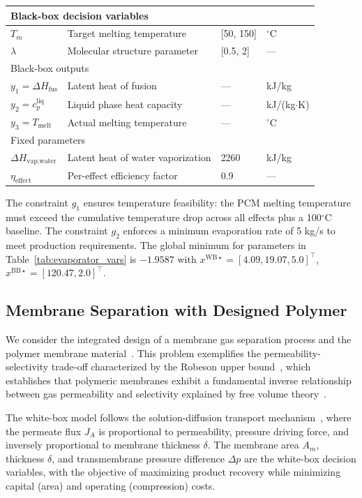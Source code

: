 \documentclass[12pt,a4paper]{article}%
\theoremstyle{plain}%
\theoremstyle{remark}%
\theoremstyle{definition}%
\def\WB{\mathrm{WB}}
\def\BB{\mathrm{BB}}
\begin{document}
\begin{appendices}
\begin{table}[htbp]
\begin{tabular}{@{}llll@{}}
\midrule
\multicolumn{4}{l}{Black-box decision variables} \\
\midrule
$T_m$ & Target melting temperature & [50, 150] & $^\circ$C \\
$\lambda$ & Molecular structure parameter & [0.5, 2] & --- \\
\midrule
\multicolumn{4}{l}{Black-box outputs} \\
\midrule
$y_1 = \Delta H_{\text{fus}}$ & Latent heat of fusion & --- & kJ/kg \\
$y_2 = c_p^{\text{liq}}$ & Liquid phase heat capacity & --- & kJ/(kg$\cdot$K) \\
$y_3 = T_{\text{melt}}$ & Actual melting temperature & --- & $^\circ$C \\
\midrule
\multicolumn{4}{l}{Fixed parameters} \\
\midrule
$\Delta H_{\text{vap,water}}$ & Latent heat of water vaporization & 2260 & kJ/kg \\
$\eta_{\text{effect}}$ & Per-effect efficiency factor & 0.9 & --- \\
\bottomrule
\end{tabular}
\end{table}

The constraint $g_1$ ensures temperature feasibility: the PCM melting temperature must exceed the cumulative temperature drop across all effects plus a 100$^\circ$C baseline. The constraint $g_2$ enforces a minimum evaporation rate of 5 kg/s to meet production requirements. The global minimum for parameters in Table~\ref{tab:evaporator_vars} is $-1.9587$ with $x^{\WB\star} = [4.09, 19.07, 5.0]^\top$, $x^{\BB\star} = [120.47, 2.0]^\top$.

\subsection{Membrane Separation with Designed Polymer}\label{subsec:app_membrane}

We consider the integrated design of a membrane gas separation process and the polymer membrane material~\cite{qi2000membrane}. This problem exemplifies the permeability-selectivity trade-off characterized by the Robeson upper bound~\cite{robeson1991correlation,robeson2008upper}, which establishes that polymeric membranes exhibit a fundamental inverse relationship between gas permeability and selectivity explained by free volume theory~\cite{freeman1999basis}.

The white-box model follows the solution-diffusion transport mechanism~\cite{wijmans1995solution}, where the permeate flux $J_A$ is proportional to permeability, pressure driving force, and inversely proportional to membrane thickness $\delta$. The membrane area $A_m$, thickness $\delta$, and transmembrane pressure difference $\Delta p$ are the white-box decision variables, with the objective of maximizing product recovery while minimizing capital (area) and operating (compression) costs.


\end{appendices}
\end{document}
